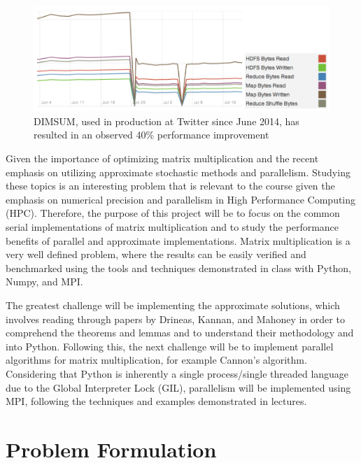 \documentclass[oneside]{article}
\begin{document}
\begin{figure}[ht!]
\centering
\includegraphics[width=\textwidth]{figures/twitter-dimsum}
\caption{DIMSUM, used in production at Twitter since June 2014, has resulted in an observed 40\% performance improvement\cite{zadeh2013dimension}}
\label{fig:transaction}
\end{figure}


Given the importance of optimizing matrix multiplication and the recent emphasis on utilizing approximate stochastic methods and parallelism. Studying these topics is an interesting problem that is relevant to the course given the emphasis on numerical precision and parallelism in High Performance Computing (HPC). Therefore, the purpose of this project will be to focus on the common serial implementations of matrix multiplication and to study the performance benefits of parallel and approximate implementations. Matrix multiplication is a very well defined problem, where the results can be easily verified and benchmarked using the tools and techniques demonstrated in class with Python, Numpy, and MPI\cite{van2011numpy}.

The greatest challenge will be implementing the approximate solutions, which involves reading through papers by Drineas, Kannan, and Mahoney in order to comprehend the theorems and lemmas and to understand their methodology and into Python. Following this, the next challenge will be to implement parallel algorithms for matrix multiplication, for example Cannon's algorithm. Considering that Python is inherently a single process/single threaded language due to the Global Interpreter Lock (GIL)\cite{beazley2010understanding}, parallelism will be implemented using MPI, following the techniques and examples demonstrated in lectures.




\section{Problem Formulation}
\end{document}
